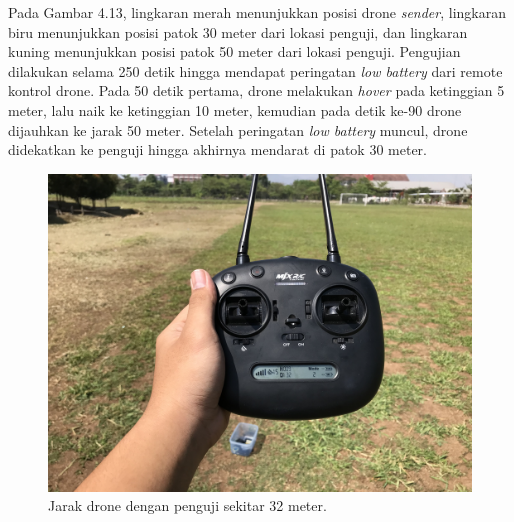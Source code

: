 Pada Gambar 4.13, lingkaran merah menunjukkan posisi drone \textit{sender}, lingkaran biru menunjukkan posisi patok 30 meter dari lokasi penguji, dan lingkaran kuning menunjukkan posisi patok 50 meter dari lokasi penguji. Pengujian dilakukan selama 250 detik hingga mendapat peringatan \textit{low battery} dari remote kontrol drone. Pada 50 detik pertama, drone melakukan \textit{hover} pada ketinggian 5 meter, lalu naik ke ketinggian 10 meter, kemudian pada detik ke-90 drone dijauhkan ke jarak 50 meter. Setelah peringatan \textit{low battery} muncul, drone didekatkan ke penguji hingga akhirnya mendarat di patok 30 meter.
\begin{figure}[H]
	\centering
	\includegraphics[scale=0.05]{./assets/Pengujian/PengujianSatuDrone/Remote}
	\caption{Jarak drone dengan penguji sekitar 32 meter.}

\end{figure}
